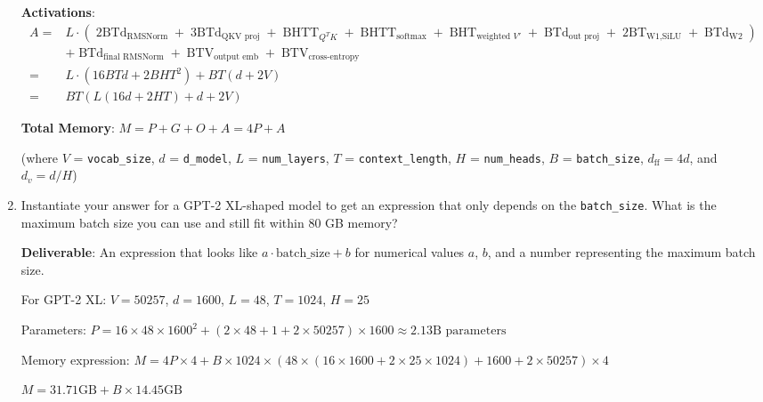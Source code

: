\begin{enumerate}[label=(\alph*)]
\begin{answer}
    \textbf{Activations}: 
    \begin{equation*}
    \begin{aligned}
        A =& L \cdot (
            \mathop{2B T d}_{\text{RMSNorm}} + 
            \mathop{3B T d}_{\text{QKV proj}} + 
            \mathop{B H T T}_{Q^TK} + 
            \mathop{B H T T}_{\text{softmax}} + 
            \mathop{B H T d_v}_{\text{weighted }V'} + 
            \mathop{B T d}_{\text{out proj}} + 
            \mathop{2B T d_{\text{ff}}}_{\text{W1,SiLU}} +
            \mathop{B T d}_{\text{W2}}
        ) \\
        &+ \mathop{B T d}_{\text{final RMSNorm}} + 
            \mathop{B T V}_{\text{output emb}} + 
            \mathop{B T V}_{\text{cross-entropy}} \\
        =& L \cdot (16 B T d + 2 B H T^2) + B T (d + 2 V) \\
        =& B T (L (16 d + 2 H T) + d + 2 V)
    \end{aligned}    
    \end{equation*}

    \textbf{Total Memory}: $M = P + G + O + A = 4P + A$

    (where $V$ = \lstinline{vocab_size}, $d$ = \lstinline{d_model}, $L$ = \lstinline{num_layers}, $T$ = \lstinline{context_length}, $H$ = \lstinline{num_heads}, $B$ = \lstinline{batch_size}, $d_{\text{ff}} = 4d$, and $d_v = d / H$)
    \end{answer}

    \item Instantiate your answer for a GPT-2 XL-shaped model to get an expression that only depends on the \lstinline{batch_size}. What is the maximum batch size you can use and still fit within 80 GB memory?

    \textbf{Deliverable}: An expression that looks like $a \cdot \text{batch\_size} + b$ for numerical values $a$, $b$, and a number representing the maximum batch size.

    \begin{answer}
    For GPT-2 XL: $V = 50257$, $d = 1600$, $L = 48$, $T = 1024$, $H = 25$

    Parameters: $P = 16 \times 48 \times 1600^2 + (2 \times 48 + 1 + 2 \times 50257) \times 1600 \approx 2.13\text{B parameters}$

    Memory expression: $M = 4P \times 4 + B \times 1024 \times (48 \times (16 \times 1600 + 2 \times 25 \times 1024) + 1600 + 2 \times 50257) \times 4$

    $M = 31.71\text{GB} + B \times 14.45\text{GB}$


\end{answer}
\end{enumerate}
